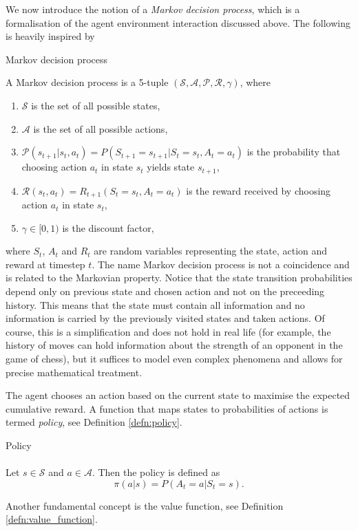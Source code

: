 We now introduce the notion of a \textit{Markov decision process}, which is a formalisation of the agent environment interaction discussed above. The following is heavily inspired by \cite[Chapter 3]{sutton2018reinforcement}
\begin{defn}{Markov decision process} 
\label{defn:markov_decision_process}
\\
\cite[Chapter 3]{sutton2018reinforcement}

A Markov decision process is a 5-tuple $(\mathcal{S}, \mathcal{A}, \mathcal{P}, \mathcal{R}, \gamma)$, where 
\begin{enumerate}
\item $\mathcal{S}$ is the set of all possible states,
\item $\mathcal{A}$ is the set of all possible actions,
\item $\mathcal{P}(s_{t+1}|s_{t},a_t)=P(S_{t+1}=s_{t+1}|S_t=s_{t},A_t=a_t)$ is the probability that choosing action $a_t$ in state $s_t$ yields state $s_{t+1}$,
\item $\mathcal{R}(s_t, a_t)=R_{t+1}(S_t=s_t, A_t=a_t)$ is the reward received by choosing action $a_t$ in state $s_t$,
\item $\gamma \in [0,1)$ is the discount factor,

\end{enumerate}
\end{defn}
where $S_t$, $A_t$ and $R_t$ are random variables representing the state, action and reward at timestep $t$. The name Markov decision process is not a coincidence and is related to the Markovian property. Notice that the state transition probabilities depend only on previous state and chosen action and not on the preceeding history. This means that the state must contain all information and no information is carried by the previously visited states and taken actions. Of course, this is a simplification and does not hold in real life (for example, the history of moves can hold information about the strength of an opponent in the game of chess), but it suffices to model even complex phenomena and allows for precise mathematical treatment. 

The agent chooses an action based on the current state to maximise the expected cumulative reward. A function that maps states to probabilities of actions is termed \textit{policy}, see Definition \ref{defn:policy}.

\begin{defn}{Policy} \label{defn:policy}
\\
\cite[Section 3.5]{sutton2018reinforcement} \\
Let $s \in \mathcal{S}$ and $a \in \mathcal{A}$. Then the policy is defined as
\begin{equation*}
\pi(a|s)=P(A_t=a|S_t=s).
\end{equation*}
\end{defn} 
Another fundamental concept is the value function, see Definition \ref{defn:value_function}.

